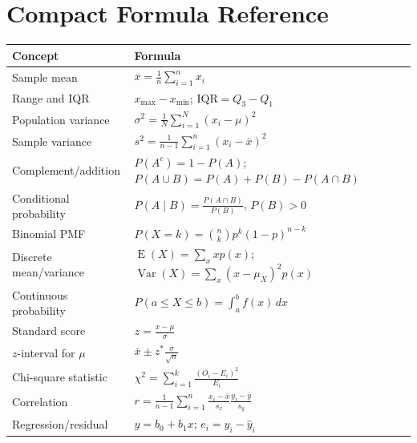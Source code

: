 \documentclass[11pt]{article}
\newcommand{\E}{\operatorname{E}}
\newcommand{\Var}{\operatorname{Var}}
\begin{document}
\section*{Compact Formula Reference}
\begin{center}
\small
\begin{tabularx}{\textwidth}{@{}lY@{}}
\toprule
Concept & Formula \\
\midrule
Sample mean & $\displaystyle \bar{x}=\frac1n\sum_{i=1}^{n}x_i$ \\
Range and IQR & $x_{\max}-x_{\min}$; $\mathrm{IQR}=Q_3-Q_1$ \\
Population variance & $\displaystyle \sigma^2=\frac1N\sum_{i=1}^{N}(x_i-\mu)^2$ \\
Sample variance & $\displaystyle s^2=\frac1{n-1}\sum_{i=1}^{n}(x_i-\bar{x})^2$ \\
Complement/addition & $P(A^c)=1-P(A)$; $P(A\cup B)=P(A)+P(B)-P(A\cap B)$ \\
Conditional probability & $\displaystyle P(A\mid B)=\frac{P(A\cap B)}{P(B)}$, $P(B)>0$ \\
Binomial PMF & $\displaystyle P(X=k)=\binom nkp^k(1-p)^{n-k}$ \\
Discrete mean/variance & $\displaystyle \E(X)=\sum_xxp(x)$; $\Var(X)=\sum_x(x-\mu_X)^2p(x)$ \\
Continuous probability & $\displaystyle P(a\le X\le b)=\int_a^bf(x)\,dx$ \\
Standard score & $\displaystyle z=\frac{x-\mu}{\sigma}$ \\
$z$-interval for $\mu$ & $\displaystyle \bar{x}\pm z^*\frac{\sigma}{\sqrt n}$ \\
Chi-square statistic & $\displaystyle \chi^2=\sum_{i=1}^{k}\frac{(O_i-E_i)^2}{E_i}$ \\
Correlation & $\displaystyle r=\frac1{n-1}\sum_{i=1}^{n}\frac{x_i-\bar{x}}{s_x}\frac{y_i-\bar{y}}{s_y}$ \\
Regression/residual & $\widehat y=b_0+b_1x$; $e_i=y_i-\widehat y_i$ \\
\bottomrule
\end{tabularx}
\end{center}
\end{document}
